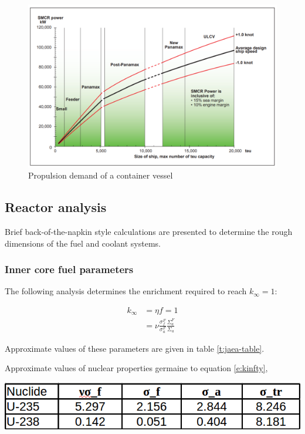 \documentclass[12pt]{article}
\begin{document}
\begin{figure}[H]                                  
    \centering                                     
    \includegraphics[width=\textwidth]{PropulsionGraph}   
    \caption{Propulsion demand of a container vessel \cite{propul}}
    \label{fig:graphship}     
\end{figure}


\subsection{Reactor analysis}
Brief back-of-the-napkin style calculations are presented to determine the rough dimensions of the fuel and coolant systems. 
\subsubsection{Inner core fuel parameters}
The following analysis determines the enrichment required to reach $k_\infty = 1$:

\begin{align}
k_\infty &= \eta f = 1 \\
 &= \nu \frac{\sigma_f^F}{\sigma_a^F} \frac{\Sigma_a^F}{\Sigma_a} \label{e:kinfty}
\end{align}

Approximate values of these parameters are given in table \ref{t:jaea-table}.

\begin{table}[H]
\begin{center}
  \caption{Approximate values of nuclear properties germaine to equation \ref{e:kinfty}, \cite{wirtz}}
  \label{t:jaea-table}
  \includegraphics[width=\textwidth]{cross-sections}
\end{center}
\end{table}
\end{document}
